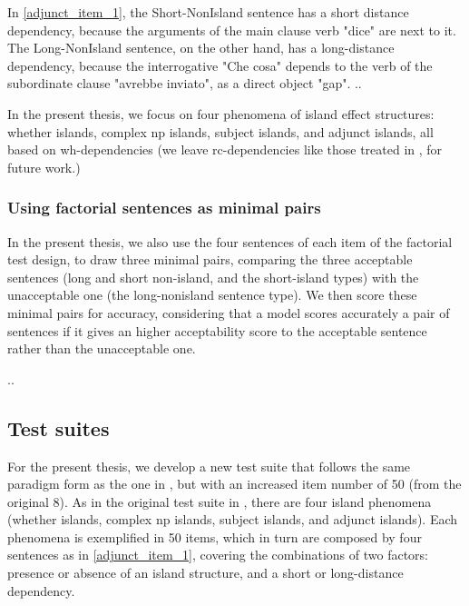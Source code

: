 In \autoref{adjunct_item_1}, the Short-NonIsland sentence has a short distance dependency, because the arguments of the main clause verb "dice" are next to it. The Long-NonIsland sentence, on the other hand, has a long-distance dependency, because the interrogative "Che cosa" depends to the verb of the subordinate clause "avrebbe inviato", as a direct object "gap".
..


In the present thesis, we focus on four phenomena of island effect structures: whether islands, complex np islands, subject islands, and adjunct islands, all based on wh-dependencies (we leave rc-dependencies like those treated in \citet{sprouse2016experimental}, for future work.)



\subsubsection{Using factorial sentences as minimal pairs}


In the present thesis, we also use the four sentences of each item of the factorial test design, to draw three minimal pairs, comparing the three acceptable sentences (long and short non-island, and the short-island types) with the unacceptable one (the long-nonisland sentence type). We then score these minimal pairs for accuracy, considering that a model scores accurately a pair of sentences if it gives an higher acceptability score to the acceptable sentence rather than the unacceptable one.

..

\subsection{Test suites}

For the present thesis, we develop a new test suite that follows the same paradigm form as the one in \citet{sprouse2016experimental}, but with an increased item number of 50 (from the original 8). As in the original test suite in \citet{sprouse2016experimental}, there are four island phenomena (whether islands, complex np islands, subject islands, and adjunct islands). Each phenomena is exemplified in 50 items, which in turn are composed by four sentences as in \autoref{adjunct_item_1}, covering the combinations of two factors: presence or absence of an island structure, and a short or long-distance dependency.



